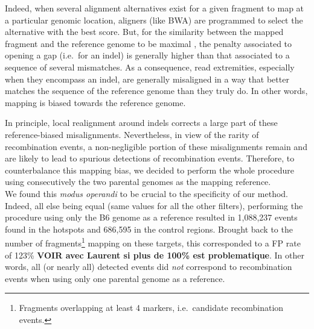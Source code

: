 Indeed, when several alignment alternatives exist for a given fragment to map at a particular genomic location, aligners (like BWA) are programmed to select the alternative with the best score.
But, for the similarity between the mapped fragment and the reference genome to be maximal \citep{smith1981identification}, the penalty associated to opening a gap (i.e.\ for an indel) is generally higher than that associated to a sequence of several mismatches.
As a consequence, read extremities, especially when they encompass an indel, are generally misaligned in a way that better matches the sequence of the reference genome than they truly do.
In other words, mapping is biased towards the reference genome.

In principle, local realignment around indels corrects a large part of these reference-biased misalignments.
Nevertheless, in view of the rarity of recombination events, a non-negligible portion of these misalignments remain and are likely to lead to spurious detections of recombination events.
Therefore, to counterbalance this mapping bias, we decided to perform the whole procedure using consecutively the two parental genomes as the mapping reference.\\


We found this \textit{modus operandi} to be crucial to the specificity of our method.
Indeed, all else being equal (same values for all the other filters), performing the procedure using only the B6 genome as a reference resulted in 1,088,237 events found in the hotspots and 686,595 in the control regions. Brought back to the number of fragments\footnote{Fragments overlapping at least 4 markers, i.e.\ candidate recombination events.} mapping on these targets, this corresponded to a FP rate of 123\% \textbf{VOIR avec Laurent si plus de 100\% est problematique}.
In other words, all (or nearly all) detected events did \textit{not} correspond to recombination events when using only one parental genome as a reference.

